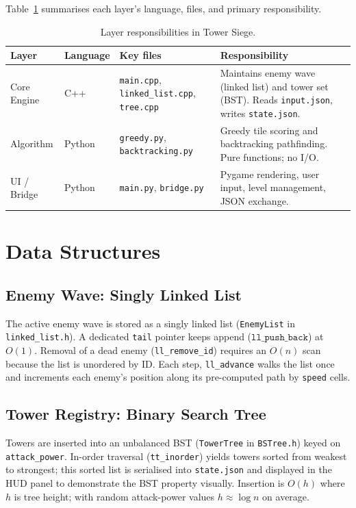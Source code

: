 \documentclass[12pt,a4paper]{report}
\begin{document}
Table~\ref{tab:layers} summarises each layer's language, files, and primary
responsibility.

\begin{table}[ht]
\centering
\caption{Layer responsibilities in Tower Siege.}
\label{tab:layers}
\begin{tabularx}{\linewidth}{lllX}
\toprule
\textbf{Layer} & \textbf{Language} & \textbf{Key files} & \textbf{Responsibility} \\
\midrule
Core Engine    & C++    & \texttt{main.cpp}, \texttt{linked\_list.cpp}, \texttt{tree.cpp}
               & Maintains enemy wave (linked list) and tower set (BST). Reads
                 \texttt{input.json}, writes \texttt{state.json}. \\
Algorithm      & Python & \texttt{greedy.py}, \texttt{backtracking.py}
               & Greedy tile scoring and backtracking pathfinding. Pure
                 functions; no I/O. \\
UI / Bridge    & Python & \texttt{main.py}, \texttt{bridge.py}
               & Pygame rendering, user input, level management, JSON exchange. \\
\bottomrule
\end{tabularx}
\end{table}

\section{Data Structures}

\subsection{Enemy Wave: Singly Linked List}

The active enemy wave is stored as a singly linked list (\texttt{EnemyList}
in \texttt{linked\_list.h}).
A dedicated \texttt{tail} pointer keeps append ($\texttt{ll\_push\_back}$)
at $O(1)$.
Removal of a dead enemy (\texttt{ll\_remove\_id}) requires an $O(n)$ scan
because the list is unordered by ID.
Each step, \texttt{ll\_advance} walks the list once and increments each enemy's
position along its pre-computed path by \texttt{speed} cells.

\subsection{Tower Registry: Binary Search Tree}

Towers are inserted into an unbalanced BST (\texttt{TowerTree} in
\texttt{BSTree.h}) keyed on \texttt{attack\_power}.
In-order traversal (\texttt{tt\_inorder}) yields towers sorted from weakest
to strongest; this sorted list is serialised into \texttt{state.json} and
displayed in the HUD panel to demonstrate the BST property visually.
Insertion is $O(h)$ where $h$ is tree height; with random attack-power values
$h \approx \log n$ on average.
\end{document}
